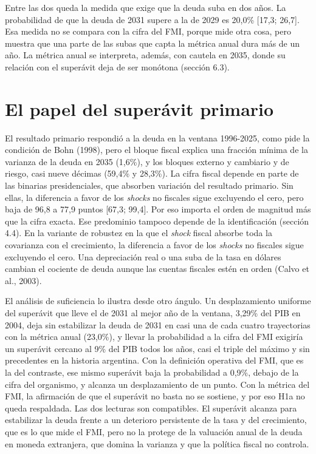 Entre las dos queda la medida que exige que la deuda suba en dos años.
La probabilidad de que la deuda de 2031 supere a la de 2029 es 20,0\%
{[}17,3; 26,7{]}. Esa medida no se compara con la cifra del FMI, porque
mide otra cosa, pero muestra que una parte de las subas que capta la
métrica anual dura más de un año. La métrica anual se interpreta,
además, con cautela en 2035, donde su relación con el superávit deja de
ser monótona (sección 6.3).

\section{El papel del superávit primario}

El resultado primario respondió a la deuda en la ventana 1996-2025, como
pide la condición de Bohn (1998), pero el bloque fiscal explica una
fracción mínima de la varianza de la deuda en 2035 (1,6\%), y los
bloques externo y cambiario y de riesgo, casi nueve décimas (59,4\% y
28,3\%). La cifra fiscal depende en parte de las binarias
presidenciales, que absorben variación del resultado primario. Sin
ellas, la diferencia a favor de los \emph{shocks} no fiscales sigue
excluyendo el cero, pero baja de 96,8 a 77,9 puntos {[}67,3; 99,4{]}.
Por eso importa el orden de magnitud más que la cifra exacta. Ese
predominio tampoco depende de la identificación (sección 4.4). En la
variante de robustez en la que el \emph{shock} fiscal absorbe toda la
covarianza con el crecimiento, la diferencia a favor de los
\emph{shocks} no fiscales sigue excluyendo el cero. Una depreciación
real o una suba de la tasa en dólares cambian el cociente de deuda
aunque las cuentas fiscales estén en orden (Calvo et al., 2003).

El análisis de suficiencia lo ilustra desde otro ángulo. Un
desplazamiento uniforme del superávit que lleve el de 2031 al mejor año
de la ventana, 3,29\% del PIB en 2004, deja sin estabilizar la deuda de
2031 en casi una de cada cuatro trayectorias con la métrica anual
(23,0\%), y llevar la probabilidad a la cifra del FMI exigiría un
superávit cercano al 9\% del PIB todos los años, casi el triple del
máximo y sin precedentes en la historia argentina. Con la definición
operativa del FMI, que es la del contraste, ese mismo superávit baja la
probabilidad a 0,9\%, debajo de la cifra del organismo, y alcanza un
desplazamiento de un punto. Con la métrica del FMI, la afirmación de que
el superávit no basta no se sostiene, y por eso H1a no queda respaldada.
Las dos lecturas son compatibles. El superávit alcanza para estabilizar
la deuda frente a un deterioro persistente de la tasa y del crecimiento,
que es lo que mide el FMI, pero no la protege de la valuación anual de
la deuda en moneda extranjera, que domina la varianza y que la política
fiscal no controla.

